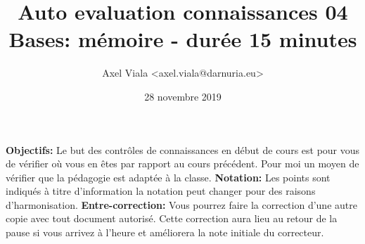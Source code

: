 \documentclass[11pt,a4paper,addpoint,answers]{exam}
\author{Axel Viala <axel.viala@darnuria.eu>}
\title{Auto evaluation connaissances 04\\Bases: mémoire - durée 15 minutes}
\date{28 novembre 2019}
\begin{document}
  \maketitle
  \textbf{Objectifs:} Le but des contrôles de connaissances en début de cours est pour vous de vérifier où vous
  en êtes par rapport au cours précédent.
  \newline
  Pour moi un moyen de vérifier que la pédagogie est adaptée à la classe.
  \newline
  \textbf{Notation:} Les points sont indiqués à titre d'information la notation peut changer pour
  des raisons d'harmonisation.
  \newline
  \textbf{Entre-correction:} Vous pourrez faire la correction d'une autre copie avec tout document
  autorisé. Cette correction aura lieu au retour de la pause si vous arrivez à l'heure et
  améliorera la note initiale du correcteur.
\end{document}
